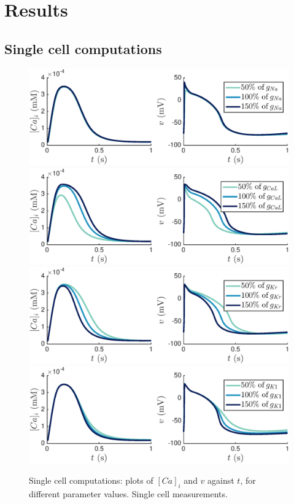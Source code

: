 \documentclass{article}
\begin{document}
\section{Results} \label{Results}
\subsection{Single cell computations} \label{Single cell computations}
%
\begin{figure}
   \includegraphics[trim=0cm 0cm 0cm 0cm, clip=true, width=1\linewidth]{sc_gna} 
   \includegraphics[trim=0cm 0cm 0cm 0cm, clip=true, width=1\linewidth]{sc_gcal} 
      \includegraphics[trim=0cm 0cm 0cm 0cm, clip=true, width=1\linewidth]{sc_gkr} 
         \includegraphics[trim=0cm 0cm 0cm 0cm, clip=true, width=1\linewidth]{sc_gk1} 
    \caption{Single cell computations: plots of $[Ca]_i$ and $v$  against $t$, for different parameter values. Single cell measurements.}
    \label{fig:4a}
\end{figure}
\end{document}
